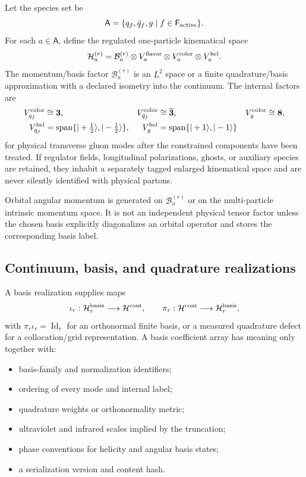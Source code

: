 \documentclass[11pt]{article}
\newcommand{\Span}{\operatorname{span}}
\newcommand{\Id}{\operatorname{Id}}
\newcommand{\Hil}{\mathcal H}
\newcommand{\cB}{\mathcal B}
\begin{document}
Let the species set be
\begin{equation}
 \mathsf A=\{q_f,\bar q_f,g\mid f\in\mathsf F_{\rm active}\}.
\label{eq:species-set}
\end{equation}
For each \(a\in\mathsf A\), define the regulated one-particle kinematical
space
\begin{equation}
 \Hil_a^{(r)}
 =\cB_a^{(r)}
 \otimes V_a^{\rm flavor}
 \otimes V_a^{\rm color}
 \otimes V_a^{\rm hel}.
\label{eq:one-particle-space}
\end{equation}
The momentum/basis factor \(\cB_a^{(r)}\) is an \(L^2\) space or a finite
quadrature/basis approximation with a declared isometry into the continuum.
The internal factors are
\begin{align}
 V_{q_f}^{\rm color}&\cong\bm 3,
 &V_{\bar q_f}^{\rm color}&\cong\overline{\bm 3},
 &V_g^{\rm color}&\cong\bm 8,
\label{eq:color-reps}\\
 V_{q_f}^{\rm hel}&=\Span\{|+\tfrac12\rangle,|-\tfrac12\rangle\},
 &V_g^{\rm hel}&=\Span\{|+1\rangle,|-1\rangle\}
\label{eq:helicity-reps}
\end{align}
for physical transverse gluon modes after the constrained components have
been treated.  If regulator fields, longitudinal polarizations, ghosts, or
auxiliary species are retained, they inhabit a separately tagged enlarged
kinematical space and are never silently identified with physical partons.

Orbital angular momentum is generated on \(\cB_a^{(r)}\) or on the
multi-particle intrinsic momentum space.  It is not an independent physical
tensor factor unless the chosen basis explicitly diagonalizes an orbital
operator and stores the corresponding basis label.

\subsection{Continuum, basis, and quadrature realizations}

A basis realization supplies maps
\begin{equation}
 \iota_r:\Hil_r^{\rm basis}\longrightarrow\Hil^{\rm cont},
 \qquad
 \pi_r:\Hil^{\rm cont}\longrightarrow\Hil_r^{\rm basis},
\label{eq:basis-isometries}
\end{equation}
with \(\pi_r\iota_r=\Id_r\) for an orthonormal finite basis, or a measured
quadrature defect for a collocation/grid representation.  A basis coefficient
array has meaning only together with:
\begin{itemize}
\item basis-family and normalization identifiers;
\item ordering of every mode and internal label;
\item quadrature weights or orthonormality metric;
\item ultraviolet and infrared scales implied by the truncation;
\item phase conventions for helicity and angular basis states;
\item a serialization version and content hash.
\end{itemize}
\end{document}

